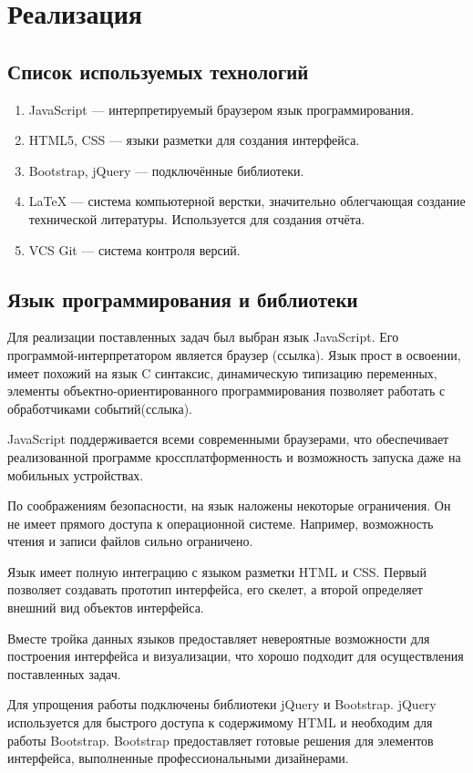 \section{Реализация}
\subsection{Список используемых технологий}
\begin{enumerate}
\item JavaScript — интерпретируемый браузером язык программирования.
\item HTML5, CSS — языки разметки для создания интерфейса.
\item Bootstrap, jQuery — подключённые библиотеки.
\item LaTeX — система компьютерной верстки, значительно облегчающая создание технической литературы. Используется для создания отчёта.
\item VCS Git — система контроля версий.
\end{enumerate}
\subsection{Язык программирования и библиотеки}
Для реализации поставленных задач был выбран язык JavaScript. Его программой-интерпретатором является браузер (ссылка). Язык прост в освоении, имеет похожий на язык C синтаксис, динамическую типизацию переменных, элементы объектно-ориентированного программирования позволяет работать с обработчиками событий(сслыка).

JavaScript поддерживается всеми современными браузерами, что обеспечивает реализованной программе кроссплатформенность и возможность запуска даже на мобильных устройствах.

По соображениям безопасности, на язык наложены некоторые ограничения. Он не имеет прямого доступа к операционной системе. Например, возможность чтения и записи файлов сильно ограничено.

Язык имеет полную интеграцию с языком разметки HTML и CSS. Первый позволяет создавать прототип интерфейса, его скелет, а второй определяет внешний вид объектов интерфейса.

Вместе тройка данных языков предоставляет невероятные возможности для построения интерфейса и визуализации, что хорошо подходит для осуществления поставленных задач.

Для упрощения работы подключены библиотеки jQuery и Bootstrap. jQuery используется для быстрого доступа к содержимому HTML и необходим для работы Bootstrap. Bootstrap предоставляет готовые решения для элементов интерфейса, выполненные профессиональными дизайнерами. 

